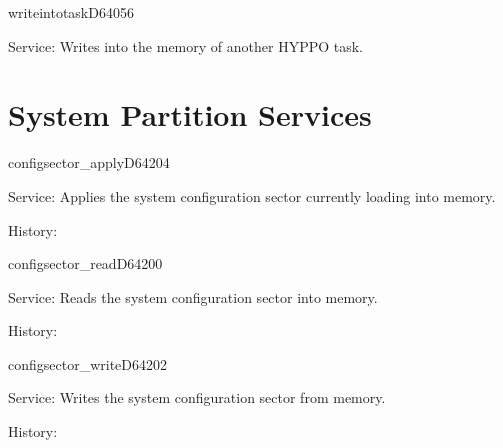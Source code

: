 \newpage
\begin{hyppotrap}{writeintotask}{D640}{56}
\item [Service:]
  Writes into the memory of another HYPPO task.
\notimplemented
\end{hyppotrap}



\newpage
\section{System Partition Services}


\begin{hyppotrap}{configsector\_apply}{D642}{04}
\item [Service:]
  Applies the system configuration sector currently loading into memory.
\item [History:]
\end{hyppotrap}


\begin{hyppotrap}{configsector\_read}{D642}{00}
\item [Service:]
  Reads the system configuration sector into memory.
\item [History:]
\end{hyppotrap}


\begin{hyppotrap}{configsector\_write}{D642}{02}
\item [Service:]
  Writes the system configuration sector from memory.
\item [History:]
\end{hyppotrap}



